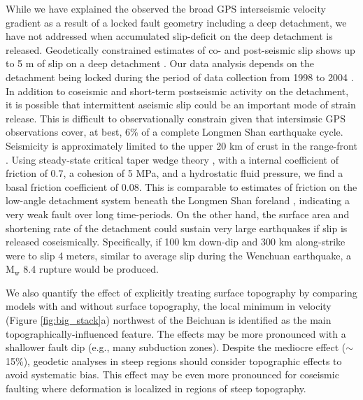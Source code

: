 \documentclass[12pt]{article}
\begin{document}
While we have explained the observed the broad GPS interseismic velocity gradient as a result of a locked fault geometry including a deep detachment, we have not addressed when accumulated slip-deficit on the deep detachment is released. Geodetically constrained estimates of co- and post-seismic slip shows up to 5 m of slip on a deep detachment \citep{Qi2011}. Our data analysis depends on the detachment being locked during the period of data collection from 1998 to 2004 \citep{gan07}. In addition to coseismic and short-term postseismic activity on the detachment, it is possible that intermittent aseismic slip could be an important mode of strain release. This is difficult to observationally constrain given that intersimsic GPS observations cover, at best, 6\% of a complete Longmen Shan earthquake cycle. Seismicity is approximately limited to the upper 20 km of crust in the range-front \citep{Li2010a}. Using steady-state critical taper wedge theory \citep{dahlen90}, with a internal coefficient of friction of 0.7, a cohesion of 5 MPa, and a hydrostatic fluid pressure, we find a basal friction coefficient of 0.08. This is comparable to estimates of friction on the low-angle detachment system beneath the Longmen Shan foreland \citep{Hubbard2010}, indicating a very weak fault over long time-periods. On the other hand, the surface area and shortening rate of the detachment could sustain very large earthquakes if slip is released coseismically. Specifically, if 100 km down-dip and 300 km along-strike were to slip 4 meters, similar to average slip during the Wenchuan earthquake, a $\textrm{M}_{\textrm{w}}$ 8.4 rupture would be produced.

We also quantify the effect of explicitly treating surface topography by comparing models with and without surface topography, the local minimum in velocity (Figure \ref{fig:big_stack}a) northwest of the Beichuan is identified as the main topographically-influenced feature. The effects may be more pronounced with a shallower fault dip (e.g., many subduction zones). Despite the mediocre effect (${\sim}$15\%), geodetic analyses in steep regions should consider topographic effects to avoid systematic bias. This effect may be even more pronounced for coseismic faulting where deformation is localized in regions of steep topography.
\end{document}

